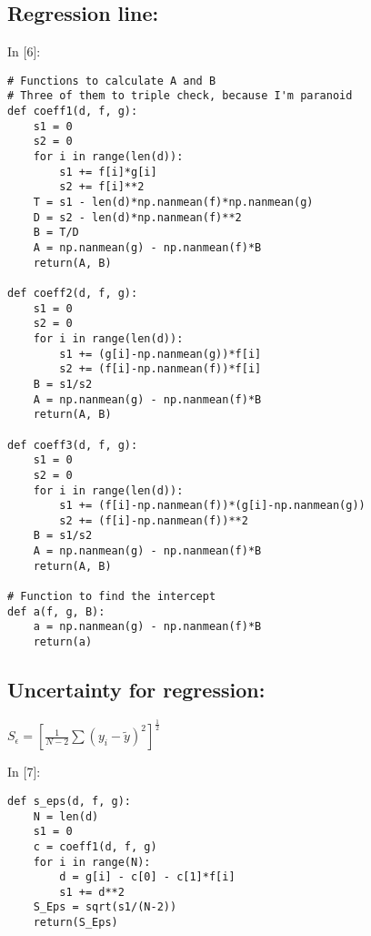 \documentclass[11pt]{article}
\newif\ifcode
\newif\ifleftmargins
\newlength{\promptlength}
\newcommand{\prompt}[3]{
        \needspace{1.1cm}
        \settowidth{\promptlength}{ #1 [#3] }
        \ifleftmargins\hspace{-\promptlength}\hspace{-5pt}\fi
        {\color{#2}#1 [#3]:}
        \ifleftmargins\vspace{-2.7ex}\fi
    }
\begin{document}
    \hypertarget{regression-line}{%
\subsection{Regression line:}\label{regression-line}}

    
\prompt{In}{incolor}{6}
\codetrue
\begin{tcolorbox}[breakable, size=fbox, boxrule=1pt, pad at break*=1mm, colback=cellbackground, colframe=cellborder]
\begin{verbatim}
# Functions to calculate A and B
# Three of them to triple check, because I'm paranoid
def coeff1(d, f, g): 
    s1 = 0
    s2 = 0
    for i in range(len(d)):
        s1 += f[i]*g[i] 
        s2 += f[i]**2
    T = s1 - len(d)*np.nanmean(f)*np.nanmean(g)
    D = s2 - len(d)*np.nanmean(f)**2
    B = T/D
    A = np.nanmean(g) - np.nanmean(f)*B
    return(A, B)

def coeff2(d, f, g):
    s1 = 0
    s2 = 0
    for i in range(len(d)):
        s1 += (g[i]-np.nanmean(g))*f[i]
        s2 += (f[i]-np.nanmean(f))*f[i]
    B = s1/s2
    A = np.nanmean(g) - np.nanmean(f)*B
    return(A, B)

def coeff3(d, f, g):
    s1 = 0
    s2 = 0
    for i in range(len(d)):
        s1 += (f[i]-np.nanmean(f))*(g[i]-np.nanmean(g))
        s2 += (f[i]-np.nanmean(f))**2
    B = s1/s2
    A = np.nanmean(g) - np.nanmean(f)*B 
    return(A, B)

# Function to find the intercept
def a(f, g, B):
    a = np.nanmean(g) - np.nanmean(f)*B
    return(a)
\end{verbatim}
\end{tcolorbox}
\codefalse

    \hypertarget{uncertainty-for-regression}{%
\subsection{Uncertainty for
regression:}\label{uncertainty-for-regression}}

\(S_\epsilon = \left[ \frac{1}{N-2} \sum (y_i - \tilde{y})^2 \right]^\frac{1}{2}\)

    
\prompt{In}{incolor}{7}
\codetrue
\begin{tcolorbox}[breakable, size=fbox, boxrule=1pt, pad at break*=1mm, colback=cellbackground, colframe=cellborder]
\begin{verbatim}
def s_eps(d, f, g):   
    N = len(d)
    s1 = 0
    c = coeff1(d, f, g)
    for i in range(N):
        d = g[i] - c[0] - c[1]*f[i]
        s1 += d**2
    S_Eps = sqrt(s1/(N-2))
    return(S_Eps)
\end{verbatim}
\end{tcolorbox}
\codefalse
\end{document}
